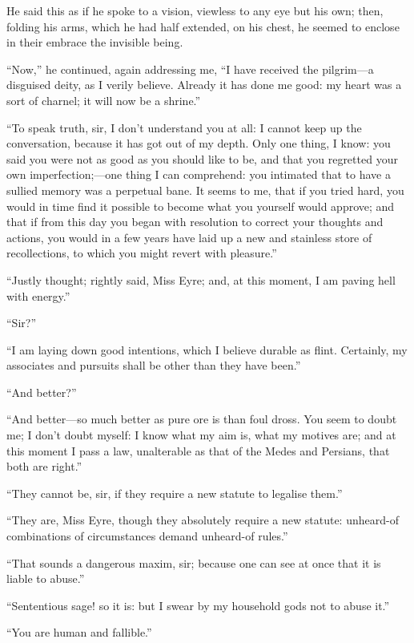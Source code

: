 He said this as if he spoke to a vision, viewless to any eye but his
own; then, folding his arms, which he had half extended, on his chest,
he seemed to enclose in their embrace the invisible being.

\enquote{Now,} he continued, again addressing me, \enquote{I have
received the pilgrim---a disguised deity, as I verily believe. Already
it has done me good: my heart was a sort of charnel; it will now be a
shrine.}

\enquote{To speak truth, sir, I don't understand you at all: I cannot
keep up the conversation, because it has got out of my depth. Only one
thing, I know: you said you were not as good as you should like to be,
and that you regretted your own imperfection;---one thing I can
comprehend: you intimated that to have a sullied memory was a perpetual
bane. It seems to me, that if you tried hard, you would in time find it
possible to become what you yourself would approve; and that if from
this day you began with resolution to correct your thoughts and actions,
you would in a few years have laid up a new and stainless store of
recollections, to which you might revert with pleasure.}

\enquote{Justly thought; rightly said, Miss Eyre; and, at this moment, I
am paving hell with energy.}

\enquote{Sir?}

\enquote{I am laying down good intentions, which I believe durable as
flint. Certainly, my associates and pursuits shall be other than they
have been.}

\enquote{And better?}

\enquote{And better---so much better as pure ore is than foul dross. 
You seem to doubt me; I don't doubt myself: I know what my aim is, what
my motives are; and at this moment I pass a law, unalterable as that of
the Medes and Persians, that both are right.}

\enquote{They cannot be, sir, if they require a new statute to legalise
them.}

\enquote{They are, Miss Eyre, though they absolutely require a new
statute: unheard-of combinations of circumstances demand unheard-of
rules.}

\enquote{That sounds a dangerous maxim, sir; because one can see at once
that it is liable to abuse.}

\enquote{Sententious sage! so it is: but I swear by my household gods
not to abuse it.}

\enquote{You are human and fallible.}

